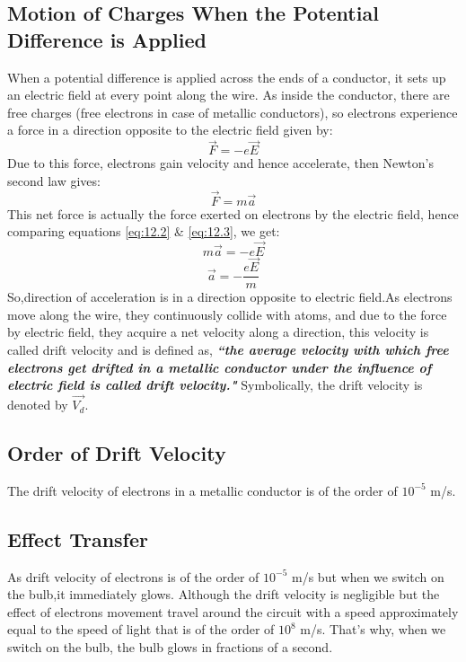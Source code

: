\subsection*{Motion of Charges When the Potential Difference is Applied}
When a potential difference is applied across the ends of a conductor, it sets up an electric field at every point along the wire. As inside the conductor, there are free charges (free electrons in case of metallic conductors), so electrons experience a force in a direction opposite to the electric field given by:
\begin{equation}\label{eq:12.2}
    \vec{F} = -e\vec{E}
\end{equation}
Due to this force, electrons gain velocity and hence accelerate, then Newton’s second law gives:
\begin{equation}\label{eq:12.3}
    \vec{F} = m\vec{a}
\end{equation}
This net force is actually the force exerted on electrons by the electric field, hence comparing equations \ref{eq:12.2} \& \ref{eq:12.3}, we get:
\begin{equation}
    m\vec{a} = -e\vec{E} \nonumber
\end{equation}
\begin{equation}\label{eq:12.4}
    \vec{a} = -\frac{e\vec{E}}{m}
\end{equation}
So,direction of acceleration is in a direction opposite to electric field.As electrons move along the wire, they continuously collide with atoms, and due to the force by electric field, they acquire a net velocity along a direction, this velocity is called drift velocity and is defined as, \textit{\textbf{``the average velocity with which free electrons get drifted in a metallic conductor under the influence of electric field is called drift velocity."}} Symbolically, the drift velocity is denoted by $\vec{V_{d}}$.
\subsection*{Order of Drift Velocity}
The drift velocity of electrons in a metallic conductor is of the order of $10^{-5}$ m/s.
\subsection*{Effect Transfer}
As drift velocity of electrons is of the order of $10^{-5}$ m/s but when we switch on the bulb,it immediately glows. Although the drift velocity is negligible but the effect of electrons movement travel around the circuit with a speed approximately equal to the speed of light that is of the order of $10^{8}$ m/s. That’s why, when we switch on the bulb, the bulb glows in fractions of a second.

